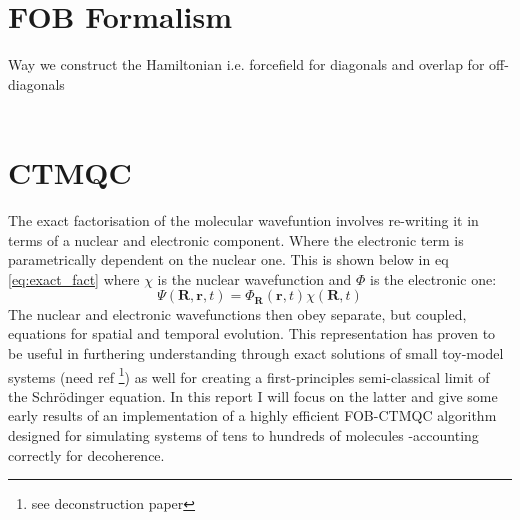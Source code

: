 \section{FOB Formalism \label{sec:FOB-formalism}}
{\LARGE Way we construct the Hamiltonian i.e. forcefield for diagonals and overlap for off-diagonals}
\\\\
\section{CTMQC \label{intro:CTMQC}}
The exact factorisation of the molecular wavefuntion involves re-writing it in terms of a nuclear and electronic component. Where the electronic term is parametrically dependent on the nuclear one. This is shown below in eq \eqref{eq:exact_fact} where $\chi$ is the nuclear wavefunction and $\Phi$ is the electronic one:
\begin{equation}
 \Psi(\textbf{R}, \textbf{r}, t) = \Phi_{\textbf{R}}(\textbf{r}, t) \chi(\textbf{R}, t)
 \label{eq:exact_fact}
 \end{equation}
The nuclear and electronic wavefunctions then obey separate, but coupled, equations for spatial and temporal evolution. This representation has proven to be useful in furthering understanding through exact solutions of small toy-model systems (need ref \footnote{see deconstruction paper}) as well for creating a first-principles semi-classical limit of the Schr\"odinger equation. In this report I will focus on the latter and give some early results of an implementation of a highly efficient FOB-CTMQC algorithm designed for simulating systems of tens to hundreds of molecules -accounting correctly for decoherence.


